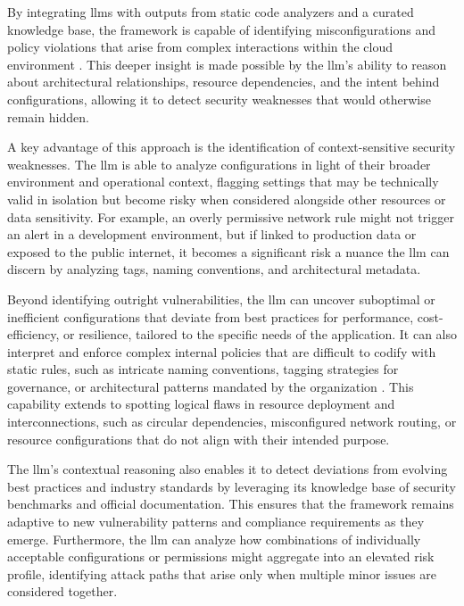 By integrating \glspl{llm} with outputs from static code analyzers and a curated knowledge base, the framework is capable of identifying misconfigurations and policy violations that arise from complex interactions within the cloud environment \cite{noauthor_evaluating_2024}. This deeper insight is made possible by the \gls{llm}'s ability to reason about architectural relationships, resource dependencies, and the intent behind configurations, allowing it to detect security weaknesses that would otherwise remain hidden.

A key advantage of this approach is the identification of context-sensitive security weaknesses. The \gls{llm} is able to analyze configurations in light of their broader environment and operational context, flagging settings that may be technically valid in isolation but become risky when considered alongside other resources or data sensitivity. For example, an overly permissive network rule might not trigger an alert in a development environment, but if linked to production data or exposed to the public internet, it becomes a significant risk a nuance the \gls{llm} can discern by analyzing tags, naming conventions, and architectural metadata.

Beyond identifying outright vulnerabilities, the \gls{llm} can uncover suboptimal or inefficient configurations that deviate from best practices for performance, cost-efficiency, or resilience, tailored to the specific needs of the application. It can also interpret and enforce complex internal policies that are difficult to codify with static rules, such as intricate naming conventions, tagging strategies for governance, or architectural patterns mandated by the organization \cite{li_iris_2025}. This capability extends to spotting logical flaws in resource deployment and interconnections, such as circular dependencies, misconfigured network routing, or resource configurations that do not align with their intended purpose.

The \gls{llm}’s contextual reasoning also enables it to detect deviations from evolving best practices and industry standards by leveraging its knowledge base of security benchmarks and official documentation. This ensures that the framework remains adaptive to new vulnerability patterns and compliance requirements as they emerge. Furthermore, the \gls{llm} can analyze how combinations of individually acceptable configurations or permissions might aggregate into an elevated risk profile, identifying attack paths that arise only when multiple minor issues are considered together.

